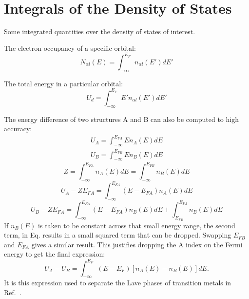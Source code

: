 
\section{Integrals of the Density of States}
%
Some integrated quantities over the density of states of interest.

The electron occupancy of a specific orbital:
%
\begin{equation}
N_{\alpha l}(E) = \int_{-\infty}^{E_{F}} n_{\alpha l}(E') dE'
\end{equation}
%

The total energy in a particular orbital:
%
\begin{equation}
U_{d} = \int_{-\infty}^{E_{F}}E'n_{\alpha l}(E') dE'
\end{equation}
%

The energy difference of two structures A and B can also be computed
to high accuracy:
%
\begin{eqnarray}
\label{eq:Ua}
U_{A} = \int_{-\infty}^{E_{FA}} E n_{A}(E) dE
\end{eqnarray}
%
\begin{eqnarray}
\label{eq:Ub}
U_{B} = \int_{-\infty}^{E_{FB}} E n_{B}(E) dE
\end{eqnarray}
%
\begin{equation}
\label{eq:totaldos}
Z = \int_{-\infty}^{E_{FA}} n_{A}(E)dE = \int_{-\infty}^{E_{FB}}n_{B}(E)dE
\end{equation}
%
\begin{equation}
U_{A}-ZE_{FA}= \int_{-\infty}^{E_{FA}}(E-E_{FA})n_{A}(E)dE
\end{equation}
%
\begin{equation}
U_{B}-ZE_{FA}= \int_{-\infty}^{E_{FA}}(E-E_{FA})n_{B}(E)dE + \int_{E_{FB}}^{E_{FA}}n_{B}(E)dE
\end{equation}
%
If $n_{B}(E)$ is taken to be constant across that small energy range, the second term, in
Eq. results in a small squared term that can be dropped. Swapping $E_{FB}$ and $E_{FA}$ gives
a similar result. This justifies dropping the A index on the Fermi energy to get the
final expression:
%
\begin{equation}
U_{A}-U_{B} = \int_{-\infty}^{E_{F}}(E-E_{F})[n_{A}(E) -n_{B}(E)]dE.
\end{equation}
%
It is this expression used to separate the Lave phases of transition metals in Ref.~\cite{haydock76}.

